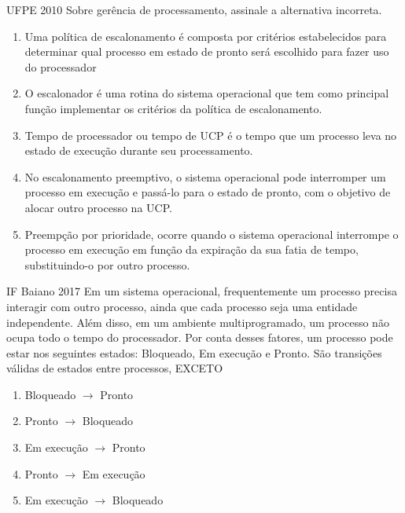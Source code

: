 \documentclass[aspectratio=169,
				xcolor=table]{beamer}
\begin{document}
	\begin{frame}{UFPE 2010}
		Sobre gerência de processamento, assinale a alternativa incorreta.
		\begin{enumerate}[a]
			\item Uma política de escalonamento é composta por critérios estabelecidos para determinar qual processo em estado de pronto será escolhido para fazer uso do processador
			\item O escalonador é uma rotina do sistema operacional que tem como principal função implementar os critérios da política de escalonamento.
			\item Tempo de processador ou tempo de UCP é o tempo que um processo leva no estado de execução durante seu processamento.
			\item No escalonamento preemptivo, o sistema operacional pode interromper um processo em execução e passá-lo para o estado de pronto, com o objetivo de alocar outro processo na UCP.
			\item \alert{Preempção por prioridade, ocorre quando o sistema operacional interrompe o processo em execução em função da expiração da sua fatia de tempo, substituindo-o por outro processo.}
		\end{enumerate}
	\end{frame}

	\begin{frame}{IF Baiano 2017}
		Em um sistema operacional, frequentemente um processo precisa interagir com outro processo, ainda que cada processo seja uma entidade independente. Além disso, em um ambiente multiprogramado, um processo não ocupa todo o tempo do processador. Por conta desses fatores, um processo pode estar nos seguintes estados: Bloqueado, Em execução e Pronto.
	São transições válidas de estados entre processos, EXCETO
		\begin{enumerate}[a]
			\item Bloqueado $\to$ Pronto
			\item Pronto $\to$ Bloqueado 
			\item Em execução $\to$ Pronto 
			\item Pronto $\to$ Em execução
			\item Em execução $\to$ Bloqueado			
		\end{enumerate}
	\end{frame}
\end{document}
